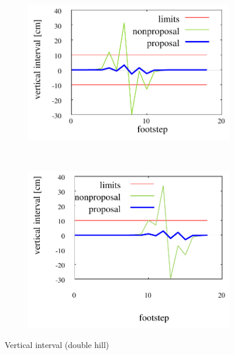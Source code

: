 \documentclass[autodetect-engine,dvipdfmx-if-dvi,ja=standard,a4j,jbase=11pt,magstyle=nomag*]{bxjsreport}
\begin{document}
\begin{figure}[pt]%
    \centering%
    \begin{subfigure}[c]{\linewidth}
        \centering%
        \includegraphics[width=0.75\linewidth, clip]{./figure/sim_hrp2_hill2_100_0_zdiff.pdf}%
        \label{fig:sim_hrp2_hill2_100_0_zdiff}%
    \end{subfigure}\\ %
    \begin{subfigure}[c]{\linewidth}
        \centering%
        \includegraphics[width=0.75\linewidth, clip]{./figure/sim_hrp2_hill2_100_2_zdiff.pdf}%
        \label{fig:sim_hrp2_hill2_100_2_zdiff}%
    \end{subfigure}%
    \caption{Vertical interval (double hill)}%
    \label{fig:sim_hrp2_hill2_zdiff}%
\end{figure}
\end{document}
